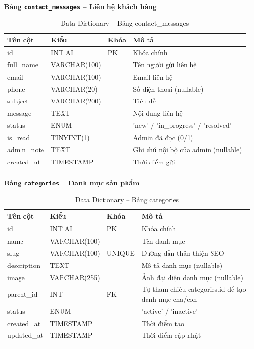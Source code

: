 \documentclass[a4paper]{article}
\begin{document}
\textbf{Bảng \texttt{contact\_messages} -- Liên hệ khách hàng}

\begin{longtable}{|p{3.5cm}|p{2.5cm}|p{1.5cm}|p{5cm}|}
\hline
\textbf{Tên cột} & \textbf{Kiểu} & \textbf{Khóa} & \textbf{Mô tả} \\
\hline
\endhead
id & INT AI & PK & Khóa chính \\
\hline
full\_name & VARCHAR(100) & & Tên người gửi liên hệ \\
\hline
email & VARCHAR(100) & & Email liên hệ \\
\hline
phone & VARCHAR(20) & & Số điện thoại (nullable) \\
\hline
subject & VARCHAR(200) & & Tiêu đề \\
\hline
message & TEXT & & Nội dung liên hệ \\
\hline
status & ENUM & & 'new' / 'in\_progress' / 'resolved' \\
\hline
is\_read & TINYINT(1) & & Admin đã đọc (0/1) \\
\hline
admin\_note & TEXT & & Ghi chú nội bộ của admin (nullable) \\
\hline
created\_at & TIMESTAMP & & Thời điểm gửi \\
\hline
\caption{Data Dictionary -- Bảng contact\_messages}
\end{longtable}

\textbf{Bảng \texttt{categories} -- Danh mục sản phẩm}

\begin{longtable}{|p{3.5cm}|p{2.5cm}|p{1.5cm}|p{5cm}|}
\hline
\textbf{Tên cột} & \textbf{Kiểu} & \textbf{Khóa} & \textbf{Mô tả} \\
\hline
\endhead
id & INT AI & PK & Khóa chính \\
\hline
name & VARCHAR(100) & & Tên danh mục \\
\hline
slug & VARCHAR(100) & UNIQUE & Đường dẫn thân thiện SEO \\
\hline
description & TEXT & & Mô tả danh mục (nullable) \\
\hline
image & VARCHAR(255) & & Ảnh đại diện danh mục (nullable) \\
\hline
parent\_id & INT & FK & Tự tham chiếu categories.id để tạo danh mục cha/con \\
\hline
status & ENUM & & 'active' / 'inactive' \\
\hline
created\_at & TIMESTAMP & & Thời điểm tạo \\
\hline
updated\_at & TIMESTAMP & & Thời điểm cập nhật \\
\hline
\caption{Data Dictionary -- Bảng categories}
\end{longtable}
\end{document}
